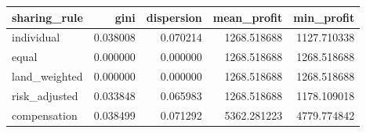 \begin{tabular}{lrrrr}
\toprule
sharing\_rule & gini & dispersion & mean\_profit & min\_profit \\
\midrule
individual & 0.038008 & 0.070214 & 1268.518688 & 1127.710338 \\
equal & 0.000000 & 0.000000 & 1268.518688 & 1268.518688 \\
land\_weighted & 0.000000 & 0.000000 & 1268.518688 & 1268.518688 \\
risk\_adjusted & 0.033848 & 0.065983 & 1268.518688 & 1178.109018 \\
compensation & 0.038499 & 0.071292 & 5362.281223 & 4779.774842 \\
\bottomrule
\end{tabular}
